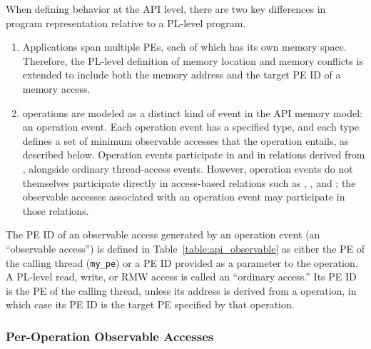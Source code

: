 When defining behavior at the \openshmem API level, there are two key differences in
    program representation relative to a PL-level program.
\begin{enumerate}
    \item Applications span multiple \acp{PE}, each of which has its own memory space.
        Therefore, the PL-level definition of memory location and memory conflicts is
        extended to include both the memory address and the target \ac{PE} ID of a
        memory access.
    \item \openshmem operations are modeled as a distinct kind of event in the API memory
        model: an operation event. Each operation event has a specified type, and each
        type defines a set of minimum observable accesses that the operation entails, as
        described below. Operation events participate in \relSB{} and in relations
        derived from \relSB{}, alongside ordinary thread-access events. However,
        operation events do not themselves participate directly in access-based relations
        such as \relMO{}, \relRF{}, and \relSW{}; the observable accesses associated with
        an operation event may participate in those relations.
\end{enumerate}

The \ac{PE} ID of an observable access generated by an operation event (an ``observable
    access'') is defined in Table~\ref{table:api_observable} as either the \ac{PE} of
    the calling thread (\texttt{my\_pe}) or a \ac{PE} ID provided as a parameter to the
    operation.
A PL-level read, write, or RMW access is called an ``ordinary access.'' Its \ac{PE} ID
    is the \ac{PE} of the calling thread, unless its address is derived from a
     operation, in which case its \ac{PE} ID is the target \ac{PE}
    specified by that operation.

\subsubsection{Per-Operation Observable Accesses}\label{subsubsec:api_observable}

